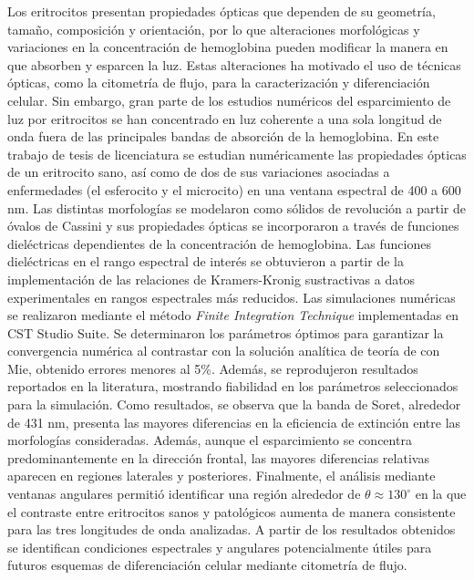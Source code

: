 

\begin{abstracts}        %

%
%

Los eritrocitos presentan propiedades ópticas que dependen de su geometría, tamaño, composición y orientación, por lo que alteraciones morfológicas y variaciones en la concentración de hemoglobina pueden modificar la manera en que absorben y esparcen la luz. Estas alteraciones ha motivado el uso de técnicas ópticas, como la citometría de flujo, para la caracterización y diferenciación celular. Sin embargo, gran parte de los estudios numéricos del esparcimiento de luz por eritrocitos se han concentrado en luz coherente a una sola longitud de onda fuera de las principales bandas de absorción de la hemoglobina. En este trabajo de tesis de licenciatura se estudian numéricamente las propiedades ópticas de un eritrocito sano, así como de dos de sus variaciones asociadas a enfermedades (el esferocito y el microcito) en una ventana espectral de 400 a 600 nm. Las distintas  morfologías se modelaron como sólidos de revolución a partir de óvalos de Cassini y sus propiedades ópticas se incorporaron a través de funciones dieléctricas dependientes de la concentración de hemoglobina. Las funciones dieléctricas en el rango espectral de interés se obtuvieron a partir de la implementación de las relaciones de Kramers-Kronig sustractivas a datos experimentales en rangos espectrales más reducidos. Las simulaciones numéricas se realizaron mediante el método \textit{Finite Integration Technique} implementadas en CST Studio Suite. Se determinaron los parámetros óptimos para garantizar la convergencia numérica al contrastar con la solución analítica de teoría de con Mie, obtenido errores menores al 5\%. Además, se reprodujeron resultados reportados en la literatura, mostrando fiabilidad en los parámetros seleccionados para la simulación. Como resultados, se observa que la banda de Soret, alrededor de 431 nm, presenta las mayores diferencias en la eficiencia de extinción entre las morfologías consideradas. Además, aunque el esparcimiento se concentra predominantemente en la dirección frontal, las mayores diferencias relativas aparecen en regiones laterales y posteriores.  Finalmente, el análisis mediante ventanas angulares permitió identificar una región alrededor de $\theta\approx130^\circ$ en la que el contraste entre eritrocitos sanos y patológicos aumenta de manera consistente para las tres longitudes de onda analizadas. A partir de los resultados obtenidos se identifican condiciones espectrales y angulares potencialmente útiles para futuros esquemas de diferenciación celular mediante citometría de flujo.

\end{abstracts}

